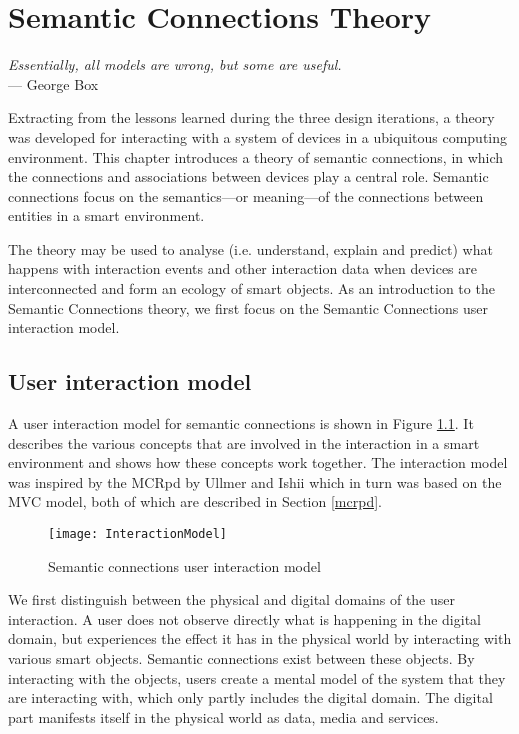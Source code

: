 \chapter{Semantic Connections Theory}
\label{SemanticConnectionsTheory}

\begin{flushright}{\slshape    
Essentially, all models are wrong, but some are useful.} \\ \medskip
    --- George Box
\end{flushright}




Extracting from the lessons learned during the three design iterations, a theory was developed for interacting with a system of devices in a ubiquitous computing environment. This chapter introduces a theory of semantic connections, in which the connections and associations between devices play a central role. Semantic connections focus on the semantics---or meaning---of the connections between entities in a smart environment. 

The theory may be used to analyse (i.e. understand, explain and predict) what happens with interaction events and other interaction data when devices are interconnected and form an ecology of smart objects. As an introduction to the Semantic Connections theory, we first focus on the Semantic Connections user interaction model.

\section{User interaction model}
\label{InteractionModel}

A user interaction model for semantic connections is shown in Figure \ref{model}. It describes the various concepts that are involved in the interaction in a smart environment and shows how these concepts work together. The interaction model was inspired by the \ac{MCRpd} by Ullmer and Ishii \cite{Ullmer2000} which in turn was based on the \ac{MVC} model, both of which are described in Section \ref{mcrpd}. 

\begin{figure}
\texttt{[image: InteractionModel]}
\caption{Semantic connections user interaction model}
\label{model}
\end{figure}

We first distinguish between the physical and digital domains of the user interaction. A user does not observe directly what is happening in the digital domain, but experiences the effect it has in the physical world by interacting with various smart objects. Semantic connections exist between these objects. By interacting with the objects, users create a mental model of the system that they are interacting with, which only partly includes the digital domain. The digital part manifests itself in the physical world as data, media and services. 

